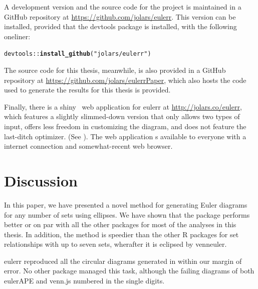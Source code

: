 \documentclass[
  oneside,
  openany,
  numbers=noendperiod,
  parskip=half,
  bibliography=totoc
]{scrbook}\usepackage[]{graphicx}\usepackage{xcolor}
\makeatletter
\newcommand{\hlstr}[1]{\textcolor[rgb]{0.192,0.494,0.8}{#1}}%
\newcommand{\hlopt}[1]{\textcolor[rgb]{0,0,0}{#1}}%
\newcommand{\hlstd}[1]{\textcolor[rgb]{0.345,0.345,0.345}{#1}}%
\newcommand{\hlkwd}[1]{\textcolor[rgb]{0.737,0.353,0.396}{\textbf{#1}}}%
\newenvironment{kframe}{%
 \def\at@end@of@kframe{}%
 \ifinner\ifhmode%
  \def\at@end@of@kframe{\end{minipage}}%
  \begin{minipage}{\columnwidth}%
 \fi\fi%
 \def\FrameCommand##1{\hskip\@totalleftmargin \hskip-\fboxsep
 \colorbox{shadecolor}{##1}\hskip-\fboxsep
     \hskip-\linewidth \hskip-\@totalleftmargin \hskip\columnwidth}%
 \MakeFramed {\advance\hsize-\width
   \@totalleftmargin\z@ \linewidth\hsize
   \@setminipage}}%
 {\par\unskip\endMakeFramed%
 \at@end@of@kframe}
\newenvironment{knitrout}{}{} %
\newcommand{\pkg}[1]{{\fontseries{b}\selectfont #1}}
\makeatother
\begin{document}
A development version and the source code for the project is maintained in
a GitHub repository at
\url{https://github.com/jolars/eulerr}. This version
can be installed, provided that the \pkg{devtools} package is installed,
with the following oneliner:

\begin{knitrout}\small
{}\color{fgcolor}\begin{kframe}
\begin{alltt}
\hlstd{devtools}\hlopt{::}\hlkwd{install_github}\hlstd{(}\hlstr{"jolars/eulerr"}\hlstd{)}
\end{alltt}
\end{kframe}
\end{knitrout}

The source code for this thesis, meanwhile, is also provided in a GitHub
repository at
\url{https://github.com/jolars/eulerrPaper},
which also hosts the code used to generate the results for this thesis is
provided.

Finally, there is a \pkg{shiny}~\citep{Chang_2017} web application for
\pkg{eulerr} at \url{http://jolars.co/eulerr}, which features
a slightly slimmed-down version that only
allows two types of input, offers less freedom in customizing the
diagram, and does not feature the last-ditch optimizer.
(See ). The web application
s available to everyone with a internet connection and somewhat-recent web
browser.

\chapter{Discussion}
\label{ch:discussion}

In this paper, we have presented a novel method for generating Euler diagrams
for any number of sets using ellipses. We have shown that the package
performs better or on par with all the other packages for most of the analyses
in this thesis. In addition, the method is
speedier than the other R packages for set relationships with up to seven sets,
wherafter it is eclipsed by \pkg{venneuler}.

\pkg{eulerr} reproduced all the circular diagrams
generated in  within our margin of error.
No other package managed this task, although the failing diagrams of both
\pkg{eulerAPE} and \pkg{venn.js} numbered in the single digits.
\end{document}
